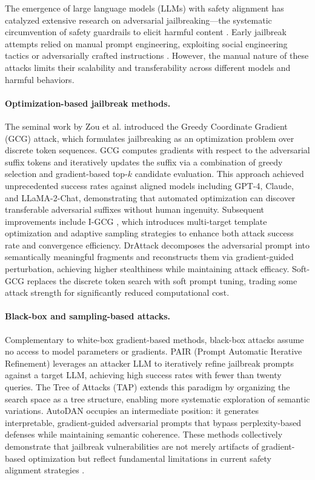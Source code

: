 \documentclass[preprint,12pt]{elsarticle}
\begin{document}
The emergence of large language models (LLMs) with safety alignment has catalyzed extensive research on adversarial jailbreaking---the systematic circumvention of safety guardrails to elicit harmful content \cite{wang2023llm_security_survey_jsj, li2022adversarial_survey_rjb}. Early jailbreak attempts relied on manual prompt engineering, exploiting social engineering tactics or adversarially crafted instructions \cite{zeng2024persuasion}. However, the manual nature of these attacks limits their scalability and transferability across different models and harmful behaviors.

\paragraph{Optimization-based jailbreak methods.} The seminal work by Zou et al. \cite{zou2023universal} introduced the Greedy Coordinate Gradient (GCG) attack, which formulates jailbreaking as an optimization problem over discrete token sequences. GCG computes gradients with respect to the adversarial suffix tokens and iteratively updates the suffix via a combination of greedy selection and gradient-based top-$k$ candidate evaluation. This approach achieved unprecedented success rates against aligned models including GPT-4, Claude, and LLaMA-2-Chat, demonstrating that automated optimization can discover transferable adversarial suffixes without human ingenuity. Subsequent improvements include I-GCG \cite{jia2024improved}, which introduces multi-target template optimization and adaptive sampling strategies to enhance both attack success rate and convergence efficiency. DrAttack \cite{ren2024drattack} decomposes the adversarial prompt into semantically meaningful fragments and reconstructs them via gradient-guided perturbation, achieving higher stealthiness while maintaining attack efficacy. Soft-GCG \cite{ren2024soft} replaces the discrete token search with soft prompt tuning, trading some attack strength for significantly reduced computational cost.

\paragraph{Black-box and sampling-based attacks.} Complementary to white-box gradient-based methods, black-box attacks assume no access to model parameters or gradients. PAIR (Prompt Automatic Iterative Refinement) \cite{chao2023jailbreaking} leverages an attacker LLM to iteratively refine jailbreak prompts against a target LLM, achieving high success rates with fewer than twenty queries. The Tree of Attacks (TAP) \cite{mehrotra2023tree} extends this paradigm by organizing the search space as a tree structure, enabling more systematic exploration of semantic variations. AutoDAN \cite{zhu2023autodan} occupies an intermediate position: it generates interpretable, gradient-guided adversarial prompts that bypass perplexity-based defenses while maintaining semantic coherence. These methods collectively demonstrate that jailbreak vulnerabilities are not merely artifacts of gradient-based optimization but reflect fundamental limitations in current safety alignment strategies \cite{liu2024llm_attack_defense_jsjy}.
\end{document}
